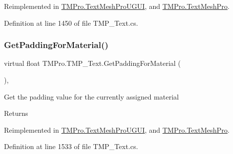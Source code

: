 Reimplemented in \mbox{\hyperlink{class_t_m_pro_1_1_text_mesh_pro_u_g_u_i_a4502a341b8623af0a250ce549762fc28}{T\+M\+Pro.\+Text\+Mesh\+Pro\+U\+G\+UI}}, and \mbox{\hyperlink{class_t_m_pro_1_1_text_mesh_pro_acbc561637c8727b420c808139960a68c}{T\+M\+Pro.\+Text\+Mesh\+Pro}}.



Definition at line 1450 of file T\+M\+P\+\_\+\+Text.\+cs.

\mbox{\label{class_t_m_pro_1_1_t_m_p___text_a7182ea72ca6b396af6cae05cee59243d}} 
\subsubsection{\texorpdfstring{GetPaddingForMaterial()}{GetPaddingForMaterial()}\hspace{0.1cm}{\footnotesize\ttfamily [1/2]}}
{\footnotesize\ttfamily virtual float T\+M\+Pro.\+T\+M\+P\+\_\+\+Text.\+Get\+Padding\+For\+Material (\begin{DoxyParamCaption}{ }\end{DoxyParamCaption})\hspace{0.3cm}{\ttfamily [protected]}, {\ttfamily [virtual]}}



Get the padding value for the currently assigned material 

\begin{DoxyReturn}{Returns}

\end{DoxyReturn}


Reimplemented in \mbox{\hyperlink{class_t_m_pro_1_1_text_mesh_pro_u_g_u_i_ae9871315cb95b1211de6c61f7500947b}{T\+M\+Pro.\+Text\+Mesh\+Pro\+U\+G\+UI}}, and \mbox{\hyperlink{class_t_m_pro_1_1_text_mesh_pro_ac5fee6a94cf72cc38078e03bbf662ae4}{T\+M\+Pro.\+Text\+Mesh\+Pro}}.



Definition at line 1533 of file T\+M\+P\+\_\+\+Text.\+cs.

\mbox{\label{class_t_m_pro_1_1_t_m_p___text_a1c51fe580e2440116d1de1280b9d189f}} 
